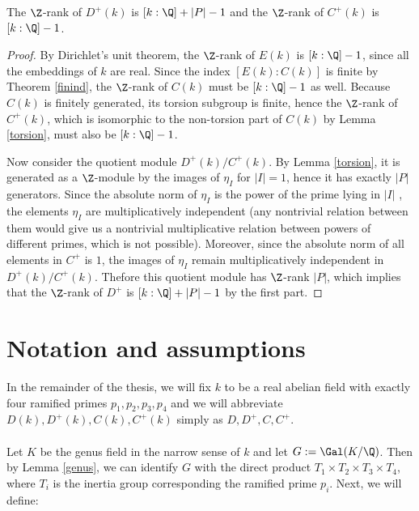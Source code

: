 \begin{prop}\label{Drank}
The $\Z$-rank of $D^+(k)$ is $[k:\Q]+|P|-1$ and the $\Z$-rank of $C^+(k)$ is $[k:\Q]-1$.
\end{prop}
\begin{proof}
By Dirichlet's unit theorem, the $\Z$-rank of $E(k)$ is $[k:\Q]-1$, since all the embeddings of $k$ are real. Since the index $[E(k):C(k)]$ is finite by Theorem \ref{finind},  the $\Z$-rank of $C(k)$ must be $[k:\Q]-1$ as well. Because $C(k)$ is finitely generated, its torsion subgroup is finite, hence the $\Z$-rank of $C^+(k)$, which is isomorphic to the non-torsion part of $C(k)$ by Lemma \ref{torsion}, must also be $[k:\Q]-1$.

Now consider the quotient module $D^+(k)/C^+(k)$. By Lemma \ref{torsion}, it is generated as a $\Z$-module by the images of $\eta_I$ for $|I|=1$, hence it has exactly $|P|$ generators. Since the absolute norm of $\eta_I$ is the power of the prime lying in $|I|$%
, the elements $\eta_I$ are multiplicatively independent (any nontrivial relation between them would give us a nontrivial multiplicative relation between powers of different primes, which is not possible). Moreover, since the absolute norm of all elements in $C^+$ is $1$, the images of $\eta_I$ remain multiplicatively independent in $D^+(k)/C^+(k)$. Thefore this quotient module has $\Z$-rank $|P|$, which implies that the $\Z$-rank of $D^+$ is $[k:\Q]+|P|-1$ by the first part.
\end{proof}

\section{Notation and assumptions}
In the remainder of the thesis, we will fix $k$ to be a real abelian field with exactly four ramified primes $p_1,p_2,p_3,p_4$ and we will abbreviate $D(k),D^{+}(k),C(k),C^+(k)$ simply as $D,D^{+},C,C^+$.
\paragraph*{}

 Let $K$ be the genus field in the narrow sense of $k$ and let $G:=\Gal(K/\Q)$. Then by Lemma \ref{genus}, we can identify $G$ with the direct product $T_1\times T_2\times T_3\times T_4$, where $T_i$ is the inertia group corresponding the ramified prime $p_i$. Next, we will define:

